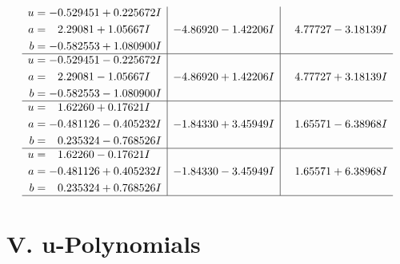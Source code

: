 \documentclass[1p]{elsarticle_modified}
\theoremstyle{definition}
\begin{document}
$$\begin{array}{c|c|c}
\begin{aligned}
u &= -0.529451 + 0.225672 I \\
a &= \phantom{-}2.29081 + 1.05667 I \\
b &= -0.582553 + 1.080900 I\end{aligned}
 & -4.86920 - 1.42206 I & \phantom{-}4.77727 - 3.18139 I \\ \hline\begin{aligned}
u &= -0.529451 - 0.225672 I \\
a &= \phantom{-}2.29081 - 1.05667 I \\
b &= -0.582553 - 1.080900 I\end{aligned}
 & -4.86920 + 1.42206 I & \phantom{-}4.77727 + 3.18139 I \\ \hline\begin{aligned}
u &= \phantom{-}1.62260 + 0.17621 I \\
a &= -0.481126 - 0.405232 I \\
b &= \phantom{-}0.235324 - 0.768526 I\end{aligned}
 & -1.84330 + 3.45949 I & \phantom{-}1.65571 - 6.38968 I \\ \hline\begin{aligned}
u &= \phantom{-}1.62260 - 0.17621 I \\
a &= -0.481126 + 0.405232 I \\
b &= \phantom{-}0.235324 + 0.768526 I\end{aligned}
 & -1.84330 - 3.45949 I & \phantom{-}1.65571 + 6.38968 I\\
 \hline 
 \end{array}$$\newpage
\newpage\renewcommand{\arraystretch}{1}
\centering \section*{ V. u-Polynomials}
\end{document}
